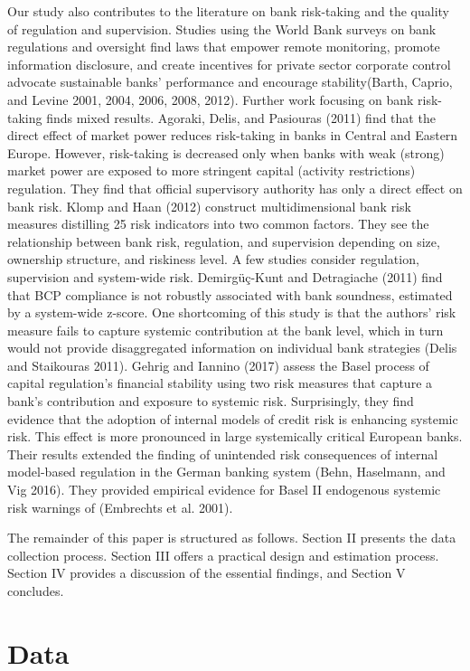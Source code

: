 \documentclass[
  10pt,
]{article}
\begin{document}
Our study also contributes to the literature on bank risk-taking and the
quality of regulation and supervision. Studies using the World Bank
surveys on bank regulations and oversight find laws that empower remote
monitoring, promote information disclosure, and create incentives for
private sector corporate control advocate sustainable banks' performance
and encourage stability(Barth, Caprio, and Levine 2001, 2004, 2006,
2008, 2012). Further work focusing on bank risk-taking finds mixed
results. Agoraki, Delis, and Pasiouras (2011) find that the direct
effect of market power reduces risk-taking in banks in Central and
Eastern Europe. However, risk-taking is decreased only when banks with
weak (strong) market power are exposed to more stringent capital
(activity restrictions) regulation. They find that official supervisory
authority has only a direct effect on bank risk. Klomp and Haan (2012)
construct multidimensional bank risk measures distilling 25 risk
indicators into two common factors. They see the relationship between
bank risk, regulation, and supervision depending on size, ownership
structure, and riskiness level. A few studies consider regulation,
supervision and system-wide risk. Demirgüç-Kunt and Detragiache (2011)
find that BCP compliance is not robustly associated with bank soundness,
estimated by a system-wide z-score. One shortcoming of this study is
that the authors' risk measure fails to capture systemic contribution at
the bank level, which in turn would not provide disaggregated
information on individual bank strategies (Delis and Staikouras 2011).
Gehrig and Iannino (2017) assess the Basel process of capital
regulation's financial stability using two risk measures that capture a
bank's contribution and exposure to systemic risk. Surprisingly, they
find evidence that the adoption of internal models of credit risk is
enhancing systemic risk. This effect is more pronounced in large
systemically critical European banks. Their results extended the finding
of unintended risk consequences of internal model-based regulation in
the German banking system (Behn, Haselmann, and Vig 2016). They provided
empirical evidence for Basel II endogenous systemic risk warnings of
(Embrechts et al. 2001).

The remainder of this paper is structured as follows. Section II
presents the data collection process. Section III offers a practical
design and estimation process. Section IV provides a discussion of the
essential findings, and Section V concludes.

\hypertarget{data}{%
\section{Data}\label{data}}
\end{document}
